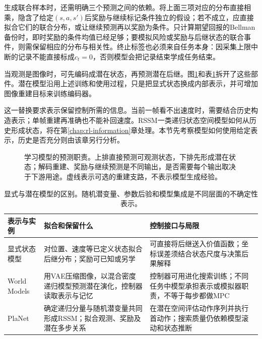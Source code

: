 生成联合样本时，还需明确三个预测之间的依赖。将上面三项对应的分布直接相乘，隐含了给定$(s,a,s')$后奖励与继续标记条件独立的假设；若不成立，应直接拟合它们的联合分布，或让继续预测再以奖励为条件。只计算期望回报的Bellman备份时，即时奖励的条件均值已经足够；要模拟风险或奖励与后继状态的联合事件，则需保留相应的分布与相关性。终止标签也必须来自任务本身：因采集上限中断的记录不能直接标成$c_t=0$，否则模型会把记录结束学成任务结束。

当观测是图像时，可先编码成潜在状态，再预测潜在后继。图\ref{fig:rl-learning-model-anatomy}和表\ref{tab:rl-learning-model-representations}拆开了这些部件。潜在模型沿用上述训练和使用过程，只是把显式状态换成内部表示，并可增加图像重建目标来训练编码器。

这一替换要求表示保留控制所需的信息。当前一帧看不出速度时，需要结合历史构造表示；单帧重建再准确也不能补回速度。RSSM一类递归状态空间模型如何从历史形成状态，将在第\ref{chap:rl-information}章处理。本节先考察模型如何使用给定表示，历史是否充分则由该章另行分析。

\begin{figure}[t]
  \centering
  
  \caption{学习模型的预测职责。上排直接预测可观测状态，下排先形成潜在状态；解码重建、奖励与继续预测是不同输出，是否需要每个输出取决于下游用途。虚线表示可选的重建支路，不表示模型生成经验。}
  \label{fig:rl-learning-model-anatomy}
\end{figure}

\begin{table}[t]
  \centering
  \small
  \begin{tabularx}{\linewidth}{>{\raggedright\arraybackslash}p{25mm} >{\raggedright\arraybackslash}X >{\raggedright\arraybackslash}X}
    \toprule
    表示与实例 & 拟合和保留什么 & 控制接口与局限 \\
    \midrule
    显式状态模型 & 对位置、速度等已定义状态拟合后继分布；奖励可已知或另学 & 可直接将后继送入价值函数；坐标误差须结合状态尺度与决策后果解释 \\
    World Models & 用VAE压缩图像，以混合密度递归模型预测潜在演化，控制器读取表示与记忆 & 控制器可用进化搜索训练；不同任务中模型承担表示或模拟器职责，不等于每步都做MPC \\
    PlaNet & 确定递归分量与随机潜变量共同形成RSSM；拟合观测、奖励及潜在多步关系 & 在潜在空间评估动作序列并执行首动作；搜索质量仍依赖模型滚动和状态推断 \\
    \bottomrule
  \end{tabularx}
  \caption{显式与潜在模型的区别。随机潜变量、参数后验和模型集成是不同层面的不确定性表示。}
  \label{tab:rl-learning-model-representations}
\end{table}

